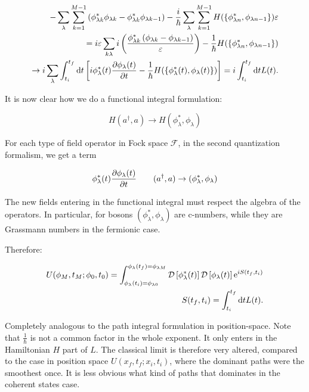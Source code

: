  \begin{align*}
     -\sum_{\lambda} \sum_{k = 1}^{M-1}\left(\phi_{\lambda k}^{*} \phi_{\lambda k} - \phi_{\lambda k}^{*} \phi_{\lambda k - 1}\right) -\frac{i}{\hbar} \sum_{\lambda} \sum_{k = 1}^{M-1} H(\{\phi_{\lambda n}^{*}, \phi_{\lambda n-1}\} ) \varepsilon \\ 
     = i\varepsilon \sum_{k\lambda} i\left(\frac{\phi_{\lambda k}^{*}\left(\phi_{\lambda k} - \phi_{\lambda k - 1}\right)}{\varepsilon}\right)- \frac{1}{\hbar}H(\{\phi_{\lambda n}^{*}, \phi_{\lambda n-1}\} ) \\ \to i \sum_{\lambda} \int_{t_{i}}^{t_{f}} \dd t \left[ i \phi_{\lambda}^{*}(t) \pdv{\phi_{\lambda}(t)}{t} - \frac{1}{\hbar}H(\{\phi_{\lambda}^{*}(t), \phi_{\lambda} (t)\} )  \right] = i\int_{t_{i}}^{t_{f}} \dd t L(t).
 \end{align*}
 
 It is now clear how we do a functional integral formulation: 
 
 \begin{equation*}
     H(a^{\dagger}, a) \to H(\phi_{\lambda}^{*}, \phi_{\lambda})
 \end{equation*}
 
 For each type of field operator in Fock space \(\mathcal{F}\), in the second quantization formalism, we get a term 
 
 \begin{equation*}
     \phi_{\lambda}^{*}(t) \pdv{\phi_{\lambda}(t)}{t} \quad \quad (a^{\dagger}, a) \to (\phi_{\lambda}^{*}, \phi_{\lambda})
 \end{equation*}
 
 The new fields entering in the functional integral must respect the algebra of the operators. In particular, for bosons $(\phi_{\lambda}^{*}, \phi_{\lambda})$ are c-numbers, while they are Grassmann numbers in the fermionic case. 
 
Therefore: 

\begin{align*}
    U(\phi_{M} ,t_{M} ; \phi_{0}, t_{0}) = \int_{\phi_{\lambda}(t_{i}) = \phi_{\lambda 0}}^{\phi_{\lambda}(t_{f}) = \phi_{\lambda M}} \mathcal{D} \left[\phi_{\lambda}^{*}(t)\right] \mathcal{D} \left[ \phi_{\lambda} (t)\right] \mathrm{e}^{iS(t_{f}, t_{i})} \\
    S(t_{f}, t_{i}) = \int_{t_{i}}^{t_{f}} \dd t L(t). 
\end{align*}

Completely analogous to the path integral formulation in position-space. Note that $\frac{1}{\hbar}$ is not a common factor in the whole exponent. It only enters in the Hamiltonian $H$ part of $L$. The classical limit is therefore very altered, compared to the case in position space $U(x_{f}, t_{f} ; x_{i}, t_{i})$, where the dominant paths were the smoothest once. It is less obvious what kind of paths that dominates in the coherent states case. \\

